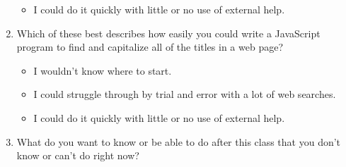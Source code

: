 \begin{enumerate}
\begin{itemize}
  \item
    I could do it quickly with little or no use of external help.\\
    
  \end{itemize}

\item
  Which of these best describes
  how easily you could write a JavaScript program
  to find and capitalize all of the titles in a web page?

  \begin{itemize}
    
  \item
    I wouldn't know where to start.
    
  \item
    I could struggle through by trial and error with a lot of web
    searches.
    
  \item
    I could do it quickly with little or no use of external help.\\
    
  \end{itemize}

\item
  What do you want to know or be able to do after this class
  that you don't know or can't do right now?

\end{enumerate}
